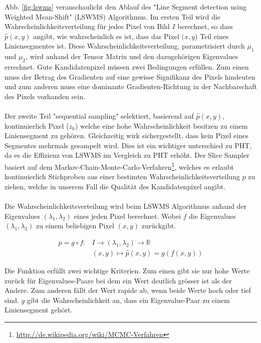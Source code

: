 Abb. \ref{fig:lswms} veranschaulicht den Ablauf des "Line Segment detection using Weighted Mean-Shift" (LSWMS) Algorithmus. Im ersten Teil wird die Wahrscheinlichkeitsverteilung für jedes Pixel von Bild $I$ berechnet, so dass $\hat{p}(x, y)$ angibt, wie wahrscheinlich es ist, dass das Pixel $(x, y$) Teil eines Liniensegmentes ist. Diese Wahrscheinlichkeitsverteilung, parametrisiert durch $\mu_1$ und $\mu_2$, wird anhand der Tensor Matrix und den dazugehörigen Eigenvalues errechnet. Gute Kandidatenpixel müssen zwei Bedingungen erfüllen. Zum einen muss der Betrag des Gradienten auf eine gewisse Signifikanz des Pixels hindeuten und zum anderen muss eine dominante Gradienten-Richtung in der Nachbarschaft des Pixels vorhanden sein.
\paragraph{}
Der zweite Teil "sequential sampling" selektiert, basierend auf $\hat{p}(x,y)$, kontinuierlich Pixel ($z_k$) welche eine hohe Wahrscheinlichkeit besitzen zu einem Liniensegment zu gehören. Gleichzeitig wirk sichergestellt, dass kein Pixel eines Segmentes mehrmals gesampelt wird. Dies ist ein wichtiger unterschied zu PHT, da es die Effizienz von LSWMS im Vergleich zu PHT erhöht. Der Slice Sampler basiert auf dem Markov-Chain-Monte-Carlo-Verfahren\footnote{\protect\url{http://de.wikipedia.org/wiki/MCMC-Verfahren}}, welches es erlaubt kontinuierlich Stichproben aus einer bestimten Wahrscheinlichkeitsverteilung $p$ zu ziehen, welche in unserem Fall die Qualität des Kandidatenpixel angibt.
\paragraph{}
Die Wahrscheinlichkeitsverteilung wird beim LSWMS Algorithmus anhand der Eigenvalues $(\lambda_1, \lambda_2)$ eines jeden Pixel berechnet. Wobei $f$ die Eigenvalues $(\lambda_1, \lambda_2)$ zu einem beliebigen Pixel $(x, y)$ zurückgibt.

\begin{equation}
\begin{split}
p = g \circ f:  &I \to (\lambda_1, \lambda_2) \to \mathbb{R} \\
                &(x, y) \mapsto \hat{p}(x, y) = g(f(x, y))
\end{split}
\end{equation}

Die Funktion erfüllt zwei wichtige Kriterien. Zum einen gibt sie nur hohe Werte zurück für Eigenvalues-Paare bei dem ein Wert deutlich grösser ist als der Andere. Zum anderen fällt der Wert rapide ab, wenn beide Werte hoch oder tief sind. $g$ gibt die Wahrscheinlichkeit an, dass ein Eigenvalue-Paar zu einem Liniensegment gehört.

